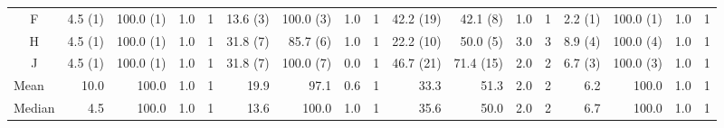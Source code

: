 \begin{landscape}
\begin{table}
{\begin{tabular}{@{}crrrrrrrrrrrrrrrr@{}}
        \multicolumn{1}{c|}{F}              & 4.5 (1)  & 100.0 (1) & 1.0  & \multicolumn{1}{c|}{1}    & 13.6 (3)                 & 100.0 (3)                & 1.0                      & \multicolumn{1}{c|}{1}    & 42.2 (19) & 42.1 (8)                 & 1.0                      & \multicolumn{1}{c|}{1}    & 2.2 (1)                  & 100.0 (1)                & 1.0                      & 1                        \\
        \multicolumn{1}{c|}{H}              & 4.5 (1)  & 100.0 (1) & 1.0  & \multicolumn{1}{c|}{1}    & 31.8 (7)                 & 85.7 (6)                 & 1.0                      & \multicolumn{1}{c|}{1}    & 22.2 (10) & 50.0 (5)                 & 3.0                      & \multicolumn{1}{c|}{3}    & 8.9 (4)                  & 100.0 (4)                & 1.0                      & 1                        \\
        \multicolumn{1}{c|}{J}              & 4.5 (1)  & 100.0 (1) & 1.0  & \multicolumn{1}{c|}{1}    & 31.8 (7)                 & 100.0 (7)                & 0.0                      & \multicolumn{1}{c|}{1}    & 46.7 (21) & 71.4 (15)                & 2.0                      & \multicolumn{1}{c|}{2}    & 6.7 (3)                  & 100.0 (3)                & 1.0                      & 1                        \\ \midrule
        \multicolumn{1}{l|}{Mean}           & 10.0     & 100.0     & 1.0  & \multicolumn{1}{c|}{1}    & 19.9                     & 97.1                     & 0.6                      & \multicolumn{1}{c|}{1}    & 33.3      & 51.3                     & 2.0                      & \multicolumn{1}{c|}{2}    & 6.2                      & 100.0                    & 1.0                      & 1                        \\
        \multicolumn{1}{l|}{Median}         & 4.5      & 100.0     & 1.0  & \multicolumn{1}{c|}{1}    & 13.6                     & 100.0                    & 1.0                      & \multicolumn{1}{c|}{1}    & 35.6      & 50.0                     & 2.0                      & \multicolumn{1}{c|}{2}    & 6.7                      & 100.0                    & 1.0                      & 1                        \\ \bottomrule
      \end{tabular}
    }%
    \label{tab:Results-Quantitative-BA}
  \end{table}
\end{landscape}

